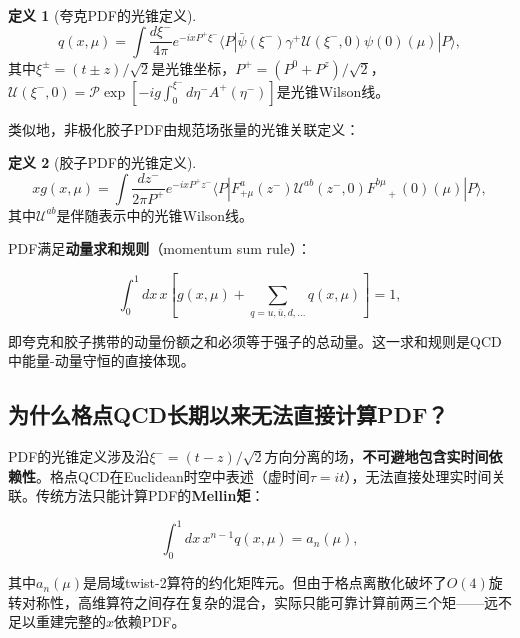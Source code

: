 \documentclass[12pt,a4paper]{ctexart}
\theoremstyle{definition}
\newtheorem{definition}{定义}[section]
\begin{document}
\begin{definition}[夸克PDF的光锥定义]
\begin{equation}
\boxed{q(x, \mu) = \int \frac{d\xi^-}{4\pi} e^{-ixP^+\xi^-} \langle P| \bar{\psi}(\xi^-) \gamma^+ \mathcal{U}(\xi^-, 0) \psi(0)(\mu) |P\rangle},
\label{eq:lightcone_quark_pdf}
\end{equation}
其中$\xi^\pm = (t \pm z)/\sqrt{2}$是光锥坐标，$P^+ = (P^0 + P^z)/\sqrt{2}$，$\mathcal{U}(\xi^-, 0) = \mathcal{P}\exp[-ig\int_0^{\xi^-} d\eta^- A^+(\eta^-)]$是光锥Wilson线。
\end{definition}

类似地，非极化胶子PDF由规范场张量的光锥关联定义\cite{Chen2025gluon,Balitsky2020}：

\begin{definition}[胶子PDF的光锥定义]
\begin{equation}
\boxed{xg(x, \mu) = \int \frac{dz^-}{2\pi P^+} e^{-ixP^+z^-} \langle P| F^{a}_{+\mu}(z^-) \mathcal{U}^{ab}(z^-, 0) F^{b\mu}_{\phantom{b\mu}+}(0)(\mu) |P\rangle},
\label{eq:lightcone_gluon_pdf}
\end{equation}
其中$\mathcal{U}^{ab}$是伴随表示中的光锥Wilson线。
\end{definition}

PDF满足\textbf{动量求和规则}（momentum sum rule）\cite{Fan2018gluon}：

\begin{equation}
\int_0^1 dx\, x\left[g(x,\mu) + \sum_{q=u,\bar{u},d,\ldots} q(x,\mu)\right] = 1,
\label{eq:momentum_sum_rule}
\end{equation}

即夸克和胶子携带的动量份额之和必须等于强子的总动量。这一求和规则是QCD中能量-动量守恒的直接体现。

\subsection{为什么格点QCD长期以来无法直接计算PDF？}

PDF的光锥定义涉及沿$\xi^- = (t-z)/\sqrt{2}$方向分离的场，\textbf{不可避地包含实时间依赖性}。格点QCD在Euclidean时空中表述（虚时间$\tau = it$），无法直接处理实时间关联。传统方法只能计算PDF的\textbf{Mellin矩}：

\begin{equation}
\int_0^1 dx\, x^{n-1} q(x, \mu) = a_n(\mu),
\label{eq:mellin_moments}
\end{equation}

其中$a_n(\mu)$是局域twist-2算符的约化矩阵元。但由于格点离散化破坏了$O(4)$旋转对称性，高维算符之间存在复杂的混合，实际只能可靠计算前两三个矩——远不足以重建完整的$x$依赖PDF。
\end{document}
